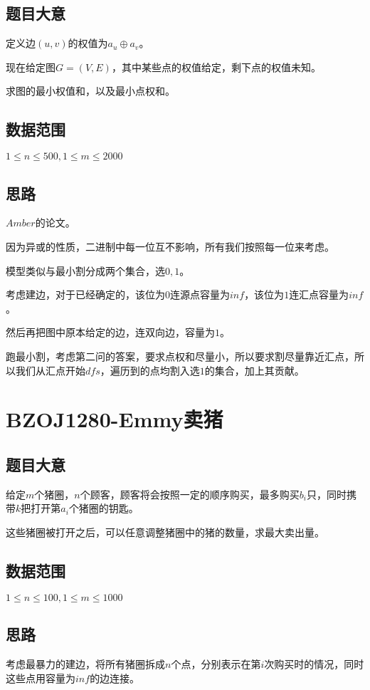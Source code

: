 \documentclass{ctexart}
\numberwithin{equation}{section}
\begin{document}
\begin{flushleft}
  \subsection{题目大意}
  定义边$(u,v)$的权值为$a_u \oplus a_v$。

  现在给定图$G=(V,E)$，其中某些点的权值给定，剩下点的权值未知。

  求图的最小权值和，以及最小点权和。
  
  \subsection{数据范围}
  $1\le n \le 500,1\le m\le 2000$
  \subsection{思路}
  $Amber$的论文。

  因为异或的性质，二进制中每一位互不影响，所有我们按照每一位来考虑。

  模型类似与最小割分成两个集合，选$0,1$。

  考虑建边，对于已经确定的，该位为$0$连源点容量为$inf$，该位为$1$连汇点容量为$inf$。

  然后再把图中原本给定的边，连双向边，容量为$1$。

  跑最小割，考虑第二问的答案，要求点权和尽量小，所以要求割尽量靠近汇点，所以我们从汇点开始$dfs$，遍历到的点均割入选$1$的集合，加上其贡献。

  \newpage

  \section{BZOJ1280-Emmy卖猪}
  \subsection{题目大意}
  给定$m$个猪圈，$n$个顾客，顾客将会按照一定的顺序购买，最多购买$b_i$只，同时携带$k$把打开第$a_i$个猪圈的钥匙。

  这些猪圈被打开之后，可以任意调整猪圈中的猪的数量，求最大卖出量。
  
  \subsection{数据范围}
  $1\le n \le 100,1\le m\le 1000$
  \subsection{思路}
  考虑最暴力的建边，将所有猪圈拆成$n$个点，分别表示在第$i$次购买时的情况，同时这些点用容量为$inf$的边连接。


\end{flushleft}
\end{document}
